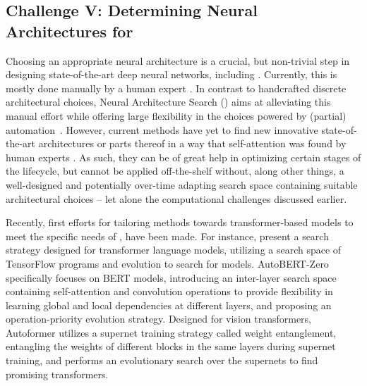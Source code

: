 \documentclass[10pt]{article} %
\begin{document}
\subsection{Challenge V: Determining Neural Architectures for \LLMs}
Choosing an appropriate neural architecture is a crucial, but non-trivial step in designing state-of-the-art deep neural networks, including \LLMs \citep{white-arxiv23a}. Currently, this is mostly done manually by a human expert \citep{hutter-blog22a}. In contrast to handcrafted discrete architectural choices, Neural Architecture Search (\NAS) aims at alleviating this manual effort  while offering large flexibility in the choices powered by (partial) automation~\citep{elsken-jmlr19a}. However, current \NAS methods have yet to find new innovative state-of-the-art architectures or parts thereof in a way that self-attention was found by human experts \citep{vaswani-neurips17a}. As such, they can be of great help in optimizing certain stages of the \LLM lifecycle, but cannot be applied off-the-shelf without, along other things, a well-designed and potentially over-time adapting search space containing suitable architectural choices -- let alone the computational challenges discussed earlier. 

Recently, first efforts for tailoring \NAS methods towards transformer-based models \citep{chitty-ieeea22a} to meet the specific needs of \LLMs, have been made. 
For instance, \citep{so-neurips2022a} present a search strategy designed for transformer language models, utilizing a search space of TensorFlow programs and evolution to search for models.
AutoBERT-Zero \citep{gao-aaai2021a} specifically focuses on BERT models, introducing an inter-layer search space containing self-attention and convolution operations to provide flexibility in learning global and local dependencies at different layers, and proposing an operation-priority evolution strategy.
Designed for vision transformers, Autoformer \citep{chen-iccv21b} utilizes a supernet training strategy called weight entanglement, entangling the weights of different blocks in the same layers during supernet training, and performs an evolutionary search over the supernets to find promising transformers.
\end{document}
